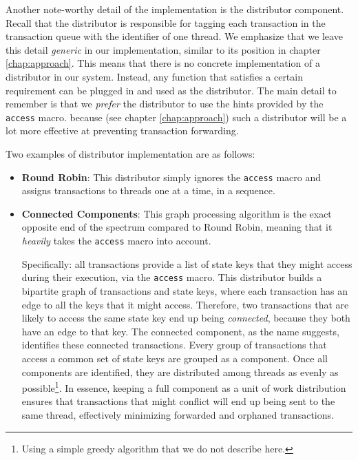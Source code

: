 Another note-worthy detail of the implementation is the distributor component. Recall that the
distributor is responsible for tagging each transaction in the transaction queue with the identifier
of one thread. We emphasize that we leave this detail \textit{generic} in our implementation,
similar to its position in chapter \ref{chap:approach}. This means that there is no concrete
implementation of a distributor in our system. Instead, any function that satisfies a certain
requirement can be plugged in and used as the distributor. The main detail to remember is that we
\textit{prefer} the distributor to use the hints provided by the \texttt{access} macro. because (see
chapter \ref{chap:approach}) such a distributor will be a lot more effective at preventing
transaction forwarding.

Two examples of distributor implementation are as follows:

\begin{itemize}
	\item \textbf{Round Robin}: This distributor simply ignores the \texttt{access} macro and
	assigns transactions to threads one at a time, in a sequence.
	\item \textbf{Connected Components}\cite{nuutilaFindingStronglyConnected1994}: This graph
	processing algorithm is the exact opposite end of the spectrum compared to Round Robin, meaning
	that it \textit{heavily} takes the \texttt{access} macro into account.

	Specifically: all transactions provide a list of state keys that they might access during their
	execution, via the \texttt{access} macro. This distributor builds a bipartite graph of
	transactions and state keys, where each transaction has an edge to all the keys that it might
	access. Therefore, two transactions that are likely to access the same state key end up being
	\textit{connected}, because they both have an edge to that key. The connected component, as the
	name suggests, identifies these connected transactions. Every group of transactions that access
	a common set of state keys are grouped as a component. Once all components are identified, they
	are distributed among threads as evenly as possible\footnote{Using a simple greedy algorithm
	that we do not describe here.}. In essence, keeping a full component as a unit of work
	distribution ensures that transactions that might conflict will end up being sent to the same
	thread, effectively minimizing forwarded and orphaned transactions.
\end{itemize}

